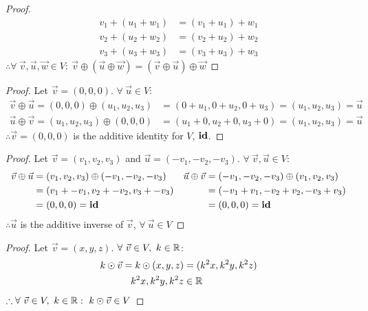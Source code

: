 \begin{enumerate}
\begin{proof}
    \begin{align*}
      v_1+(u_1+w_1) & = (v_1+u_1)+w_1 \\
      v_2+(u_2+w_2) & = (v_2+u_2)+w_2 \\
      v_3+(u_3+w_3) & = (v_3+u_3)+w_3
    \end{align*}
    $\therefore \forall~\vec{v},\vec{u},\vec{w} \in V:~\vec{v} \oplus (\vec{u} \oplus \vec{w}) = (\vec{v} \oplus \vec{u}) \oplus \vec{w}$
  \end{proof}
  \begin{proof}
    Let $\vec{v} = (0,0,0)$. $\forall~\vec{u} \in V$:
    \begin{align*}
      \vec{v} \oplus \vec{u} = (0,0,0) \oplus (u_1,u_2,u_3) & = (0+u_1,0+u_2,0+u_3) = (u_1,u_2,u_3) = \vec{u} \\
      \vec{u} \oplus \vec{v} = (u_1,u_2,u_3) \oplus (0,0,0) & = (u_1+0,u_2+0,u_3+0) = (u_1,u_2,u_3) = \vec{u}
    \end{align*}
    $\therefore \vec{v} = (0,0,0)$ is the additive identity for $V$, $\operatorname{\textbf{id}}$.
  \end{proof}
  \begin{proof}
    Let $\vec{v} = (v_1,v_2,v_3)$ and $\vec{u} = (-v_1,-v_2,-v_3)$. $\forall~\vec{v},\vec{u} \in V$:
    \begin{align*}
      \vec{v} \oplus \vec{u} & = (v_1,v_2,v_3) \oplus (-v_1,-v_2,-v_3) & \vec{u} \oplus \vec{v} & = (-v_1,-v_2,-v_3) \oplus (v_1,v_2,v_3) \\
                             & = (v_1+-v_1,v_2+-v_2,v_3+-v_3)          &                        & = (-v_1+v_1,-v_2+v_2,-v_3+v_3)          \\
                             & = (0,0,0) = \operatorname{\textbf{id}}                         &                        & = (0,0,0) = \operatorname{\textbf{id}}
    \end{align*}
    $\therefore \vec{u}$ is the additive inverse of $\vec{v}$, $\forall~\vec{u} \in V$
  \end{proof}
  \begin{proof}
    Let $\vec{v}=(x,y,z)$. $\forall~\vec{v} \in V,~k \in \mathbb{R}$:
    \begin{align*}
      k \odot \vec{v} = k \odot (x,y,z) & = (k^2x,k^2y,k^2z) \\
      k^2x,k^2y,k^2z                    & \in \mathbb{R}
    \end{align*}
    $\therefore \forall~\vec{v} \in V,~k \in \mathbb{R}:~k \odot \vec{v} \in V$
  \end{proof}

\end{enumerate}
